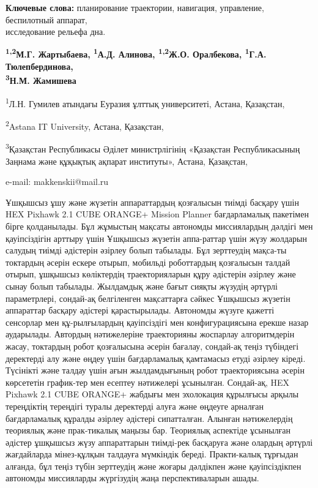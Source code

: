 {\bfseries Ключевые слова:} планирование траектории, навигация, управление,
беспилотный аппарат,\\исследование рельефа дна.


\begin{center}
{\bfseries \textsuperscript{1,2}М.Г. Жартыбаева\envelope,
\textsuperscript{1}А.Д. Алинова, \textsuperscript{1,2}Ж.О. Оралбекова,
\textsuperscript{1}Г.А. Тюлепбердинова,\\
\textsuperscript{3}Н.М. Жамишева}

\textsuperscript{1}Л.Н. Гумилев атындағы Еуразия ұлттық университеті,
Астана, Қазақстан,

\textsuperscript{2}Astana IT University, Астана, Қазақстан,

\textsuperscript{3}Қазақстан Республикасы Әділет министрлігінің
«Қазақстан Республикасының Заңнама және құқықтық ақпарат институты», Астана, Қазақстан,

e-mail: makkenskii@mail.ru
\end{center}

Ұшқышсыз ұшу және жүзетін аппараттардың қозғалысын тиімді басқару үшін
HEX Pixhawk 2.1 CUBE ORANGE+ Mission Planner бағдарламалық пакетімен
бірге қолданылады. Бұл жұмыстың мақсаты автономды миссиялардың дәлдігі
мен қауіпсіздігін арттыру үшін Ұшқышсыз жүзетін аппа-раттар үшін жүзу
жолдарын салудың тиімді әдістерін әзірлеу болып табылады. Бұл зерттеудің
мақса-ты токтардың әсерін ескере отырып, мобильді роботтардың қозғалысын
талдай отырып, ұшқышсыз көліктердің траекторияларын құру әдістерін
әзірлеу және сынау болып табылады. Жылдамдық және бағыт сияқты жүзудің
әртүрлі параметрлері, сондай-ақ белгіленген мақсаттарға сәйкес Ұшқышсыз
жүзетін аппараттар басқару әдістері қарастырылады. Автономды жүзуге
қажетті сенсорлар мен құ-рылғылардың қауіпсіздігі мен конфигурациясына
ерекше назар аударылады. Автордың нәтижелеріне траекторияны жоспарлау
алгоритмдерін жасау, токтардың робот қозғалысына әсерін бағалау,
сондай-ақ теңіз түбіндегі деректерді алу және өңдеу үшін бағдарламалық
қамтамасыз етуді әзірлеу кіреді. Түсінікті және талдау үшін ағын
жылдамдығының робот траекториясына әсерін көрсететін график-тер мен
есептеу нәтижелері ұсынылған. Сондай-ақ, HEX Pixhawk 2.1 CUBE ORANGE+
жабдығы мен эхолокация құрылғысы арқылы тереңдіктің тереңдігі туралы
деректерді алуға және өңдеуге арналған бағдарламалық құралды әзірлеу
әдістері сипатталған. Алынған нәтижелердің теориялық және прак-тикалық
маңызы бар. Теориялық аспектіде ұсынылған әдістер ұшқышсыз жүзу
аппараттарын тиімді-рек басқаруға және олардың әртүрлі жағдайларда
мінез-құлқын талдауға мүмкіндік береді. Практи-калық тұрғыдан алғанда,
бұл теңіз түбін зерттеудің және жоғары дәлдікпен және қауіпсіздікпен
автономды миссияларды жүргізудің жаңа перспективаларын ашады.

